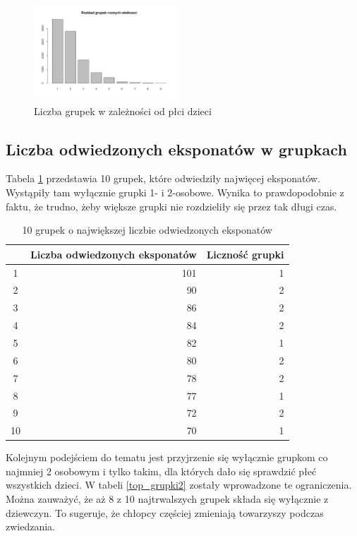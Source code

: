 \documentclass[conference]{IEEEtran}
\begin{document}
\begin{figure}[H]
\includegraphics[width=0.48\textwidth]{grupki_liczba_eksponatow.png}
\caption{Liczba grupek w zależności od płci dzieci}
\label{grupki_plec}
\end{figure}

\subsection{Liczba odwiedzonych eksponatów w grupkach}
Tabela \ref{top_grupki1} przedstawia 10 grupek, które odwiedziły najwięcej eksponatów. Wystąpiły tam wyłącznie grupki 1- i 2-osobowe. Wynika to prawdopodobnie z faktu, że trudno, żeby większe grupki nie rozdzieliły się przez tak długi czas.
\begin{table}[H]
\caption{10 grupek o największej liczbie odwiedzonych eksponatów}
\label{top_grupki1}
\centering
\begin{tabular}{|c|r|r|}
\hline
 & \textbf{Liczba odwiedzonych eksponatów} & \textbf{Liczność grupki} \\
\hline
 1  &  101 & 1 \\
 2  &   90 & 2 \\
 3  &   86 & 2 \\
 4  &   84 & 2 \\
 5  &   82 & 1 \\
 6  &   80 & 2 \\
 7  &   78 & 2 \\
 8  &   77 & 1 \\
 9  &   72 & 2 \\
 10 &   70 & 1 \\
\hline
\end{tabular}
\end{table}

Kolejnym podejściem do tematu jest przyjrzenie się wyłącznie grupkom co najmniej 2 osobowym i tylko takim, dla których dało się sprawdzić płeć wszystkich dzieci. W tabeli \ref{top_grupki2} zostały wprowadzone te ograniczenia. Można zauważyć, że aż 8 z 10 najtrwalszych grupek składa się wyłącznie z dziewczyn. To sugeruje, że chłopcy częściej zmieniają towarzyszy podczas zwiedzania.
\end{document}
